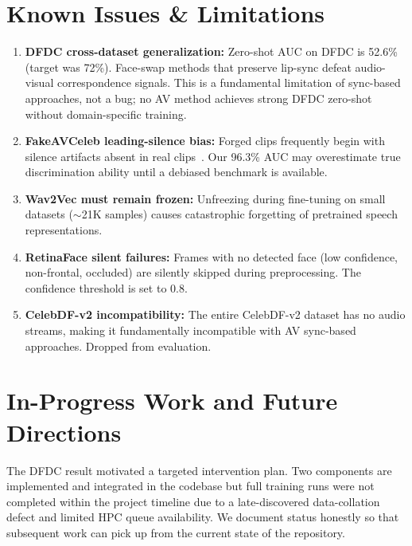 \documentclass[12pt, letterpaper]{article}
\begin{document}
\section{Known Issues \& Limitations}

\begin{enumerate}[leftmargin=1.5em, itemsep=4pt]
    \item \textbf{DFDC cross-dataset generalization:} Zero-shot AUC on DFDC is 52.6\% (target was 72\%). Face-swap methods that preserve lip-sync defeat audio-visual correspondence signals. This is a fundamental limitation of sync-based approaches, not a bug; no AV method achieves strong DFDC zero-shot without domain-specific training.
    \item \textbf{FakeAVCeleb leading-silence bias:} Forged clips frequently begin with silence artifacts absent in real clips~\cite{smeu2025}. Our 96.3\% AUC may overestimate true discrimination ability until a debiased benchmark is available.
    \item \textbf{Wav2Vec must remain frozen:} Unfreezing during fine-tuning on small datasets ($\sim$21K samples) causes catastrophic forgetting of pretrained speech representations.
    \item \textbf{RetinaFace silent failures:} Frames with no detected face (low confidence, non-frontal, occluded) are silently skipped during preprocessing. The confidence threshold is set to 0.8.
    \item \textbf{CelebDF-v2 incompatibility:} The entire CelebDF-v2 dataset has no audio streams, making it fundamentally incompatible with AV sync-based approaches. Dropped from evaluation.
\end{enumerate}

\section{In-Progress Work and Future Directions}

The DFDC result motivated a targeted intervention plan. Two components are implemented and integrated in the codebase but full training runs were not completed within the project timeline due to a late-discovered data-collation defect and limited HPC queue availability. We document status honestly so that subsequent work can pick up from the current state of the repository.
\end{document}
